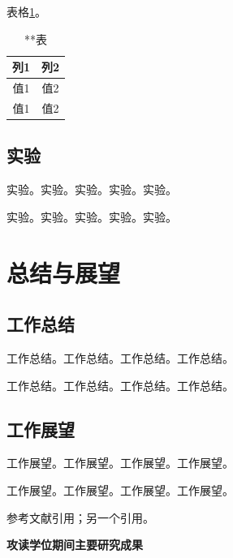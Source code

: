 \documentclass{csuthesis}
\begin{document}
    表格\ref{tab:table3}。
    \begin{table}
        \centering
        \caption{**表}
        \label{tab:table3}
        \begin{tabular}{c|c}
            \hline
            列1 & 列2 \\
            \hline
            值1 & 值2 \\
            值1 & 值2 \\
            \hline
        \end{tabular}
    \end{table}

    \section{实验}
    实验。实验。实验。实验。实验。

    实验。实验。实验。实验。实验。

    \chapter{总结与展望}
    \thispagestyle{mainstyle} %
    \section{工作总结}
    工作总结。工作总结。工作总结。工作总结。

    工作总结。工作总结。工作总结。工作总结。

    \section{工作展望}
    工作展望。工作展望。工作展望。工作展望。

    工作展望。工作展望。工作展望。工作展望。
    
    参考文献引用\cite{lamport1994latex}；另一个引用\cite{王夫之1977周易外传}。

    \printbibliography
    
    \newpage
    \vspace*{\baselineskip}
    \vspace*{18bp}
    \begin{center}
    	 \heiti \bfseries 攻读学位期间主要研究成果
    \end{center}
	\vspace*{12bp}
	\vspace*{\baselineskip}
    
\end{document}
